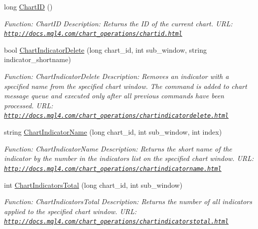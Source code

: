 \begin{DoxyCompactItemize}
long \hyperlink{class_m_q_l4_c_sharp_1_1_base_1_1_m_q_l_base_aa93469105b8426bb4fee60dbed1730d7}{Chart\+ID} ()
\begin{DoxyCompactList}\small\item\em Function\+: Chart\+ID Description\+: Returns the ID of the current chart. U\+RL\+: \href{http://docs.mql4.com/chart_operations/chartid.html}{\tt http\+://docs.\+mql4.\+com/chart\+\_\+operations/chartid.\+html} \end{DoxyCompactList}\item 
bool \hyperlink{class_m_q_l4_c_sharp_1_1_base_1_1_m_q_l_base_ac34bdc192a4b70b836bccd70a3c68b8c}{Chart\+Indicator\+Delete} (long chart\+\_\+id, int sub\+\_\+window, string indicator\+\_\+shortname)
\begin{DoxyCompactList}\small\item\em Function\+: Chart\+Indicator\+Delete Description\+: Removes an indicator with a specified name from the specified chart window. The command is added to chart message queue and executed only after all previous commands have been processed. U\+RL\+: \href{http://docs.mql4.com/chart_operations/chartindicatordelete.html}{\tt http\+://docs.\+mql4.\+com/chart\+\_\+operations/chartindicatordelete.\+html} \end{DoxyCompactList}\item 
string \hyperlink{class_m_q_l4_c_sharp_1_1_base_1_1_m_q_l_base_aa338301124cf171e2beadd3ec436ebca}{Chart\+Indicator\+Name} (long chart\+\_\+id, int sub\+\_\+window, int index)
\begin{DoxyCompactList}\small\item\em Function\+: Chart\+Indicator\+Name Description\+: Returns the short name of the indicator by the number in the indicators list on the specified chart window. U\+RL\+: \href{http://docs.mql4.com/chart_operations/chartindicatorname.html}{\tt http\+://docs.\+mql4.\+com/chart\+\_\+operations/chartindicatorname.\+html} \end{DoxyCompactList}\item 
int \hyperlink{class_m_q_l4_c_sharp_1_1_base_1_1_m_q_l_base_a7ea46413b7158125b7ba494b19e048c6}{Chart\+Indicators\+Total} (long chart\+\_\+id, int sub\+\_\+window)
\begin{DoxyCompactList}\small\item\em Function\+: Chart\+Indicators\+Total Description\+: Returns the number of all indicators applied to the specified chart window. U\+RL\+: \href{http://docs.mql4.com/chart_operations/chartindicatorstotal.html}{\tt http\+://docs.\+mql4.\+com/chart\+\_\+operations/chartindicatorstotal.\+html} \end{DoxyCompactList}\item 

\end{DoxyCompactItemize}
